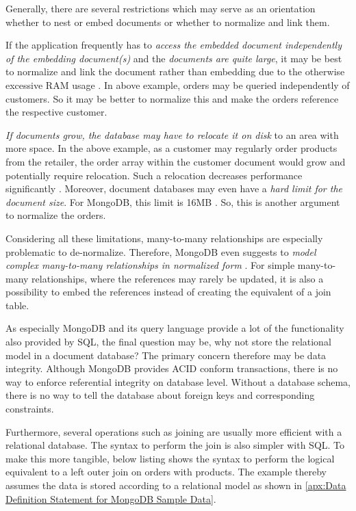 Generally, there are several restrictions which may serve as an orientation whether to nest or embed documents or whether to normalize and link them. \par 
If the application frequently has to \emph{access the embedded document independently of the embedding document(s)} and the \emph{documents are quite large}, it may be best to normalize and link the document rather than embedding due to the otherwise excessive RAM usage \cite{MongoDBAppliedDesign}. In above example, orders may be queried independently of customers. So it may be better to normalize this and make the orders reference the respective customer.\par 
\emph{If documents grow, the database may have to relocate it on disk} to an area with more space. In the above example, as a customer may regularly order products from the retailer, the order array within the customer document would grow and potentially require relocation. Such a relocation decreases performance significantly \cite{MongoDBAppliedDesign}. Moreover, document databases may even have a \emph{hard limit for the document size}. For MongoDB, this limit is 16MB \cite{MongoDBDocumentSizeLimit}. So, this is another argument to normalize the orders.\par 
Considering all these limitations, many-to-many relationships are especially problematic to de-normalize. Therefore, MongoDB even suggests to \emph{model complex many-to-many relationships in normalized form} \cite{MongoDBDataModeling}. For simple many-to-many relationships, where the references may rarely be updated, it is also a possibility to embed the references instead of creating the equivalent of a join table.\par
As especially MongoDB and its query language provide a lot of the functionality also provided by SQL, the final question may be, why not store the relational model in a document database? The primary concern therefore may be data integrity. Although MongoDB provides ACID conform transactions, there is no way to enforce referential integrity on database level. Without a database schema, there is no way to tell the database about foreign keys and corresponding constraints.\par Furthermore, several operations such as joining are usually more efficient with a relational database. The syntax to perform the join is also simpler with SQL. To make this more tangible, below listing shows the syntax to perform the logical equivalent to a left outer join on orders with products. The example thereby assumes the data is stored according to a relational model as shown in \ref{apx:Data Definition Statement for MongoDB Sample Data}. 

